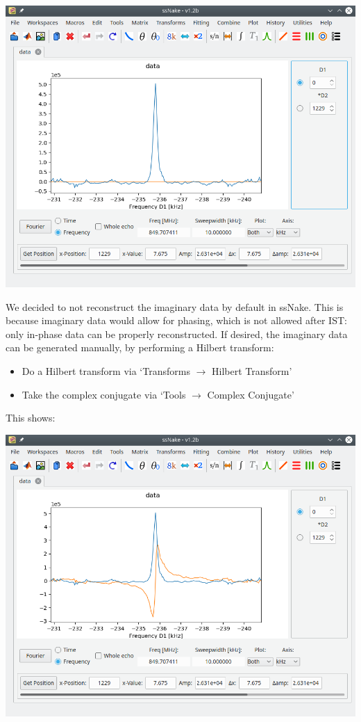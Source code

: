 \documentclass[11pt,a4paper]{article}
\begin{document}
\begin{center}
\includegraphics[width=0.8\linewidth]{Figs/Fig7.png}
\end{center}
We decided to not reconstruct the imaginary data by default in ssNake. This is
because imaginary data would allow for phasing, which is not allowed after IST:
only in-phase data can be properly reconstructed. If desired, the imaginary data
can be generated manually, by performing a Hilbert transform:
\begin{itemize}
  \item Do a Hilbert transform via `Transforms $\longrightarrow$ Hilbert
	 Transform'
  \item Take the complex conjugate via `Tools $\longrightarrow$ Complex
	 Conjugate'
\end{itemize}
This shows:
\begin{center}
\includegraphics[width=0.8\linewidth]{Figs/Fig8.png}
\end{center}
\end{document}

